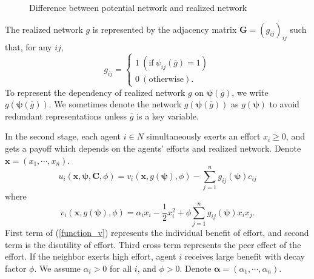 \documentclass[12pt]{article}
\theoremstyle{definition}
\newcommand{\bm}[1]{\boldsymbol{#1}}
\begin{document}
\begin{figure}[h]
\caption{Difference between potential network and realized network} \label{fig:dif}
\end{figure}

The realized network $g$ is represented by the adjacency matrix $\bm{G} = {(g_{ij})}_{ij}$ such that, for any $ij$,
\[ g_{ij} = 
	\begin{cases}
		1 \  (\text{if} \  \psi_{ij}(\overline{g}) = 1 ) \\
		0 \  (\text{otherwise}).
	\end{cases} \]
To represent the dependency of realized network $g$ on $\bm{\psi}(\overline{g})$, we write $g(\bm{\psi}(\overline{g}))$.
We sometimes denote the network $g(\bm{\psi}(\overline{g}))$ as $g(\bm{\psi})$ to avoid redundant representations unless $\overline{g}$ is a key variable.

In the second stage, each agent $i \in N$ simultaneously exerts an effort $x_i \ge 0$, and gets a payoff which depends on the agents' efforts and realized network.
Denote $\bm{x} = (x_1, \cdots, x_n)$.
\[ u_i(\bm{x}, \bm{\psi}, \bm{C}, \phi) = v_i(\bm{x}, g(\bm{\psi}), \phi) - \sum_{j=1}^n g_{ij}(\bm{\psi}) c_{ij} \]
where
\begin{equation}
\label{function_v}
	v_i(\bm{x}, g(\bm{\psi}), \phi) = \alpha_i x_i - \frac{1}{2} x_i^2 + \phi \sum_{j=1}^n g_{ij}(\bm{\psi}) x_i x_j.
\end{equation}
First term of (\ref{function_v}) represents the individual benefit of effort, and second term is the disutility of effort.
Third cross term represents the peer effect of the effort.
If the neighbor exerts high effort, agent $i$ receives large benefit with decay factor $\phi$.
We assume $\alpha_i > 0$ for all $i$, and $\phi > 0$.
Denote $\bm{\alpha} = (\alpha_1, \cdots, \alpha_n)$.
\end{document}
